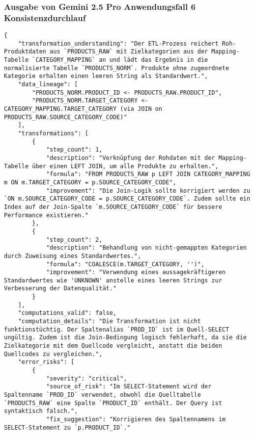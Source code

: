 \subsubsection{Ausgabe von Gemini 2.5 Pro Anwendungsfall 6 Konsistenzdurchlauf}\label{anhang:subsubsec:gemini_case6_prompt2}
\begin{lstlisting}[caption={Ausgabe: Gemini 2.5 Pro Anwendungsfall 6 Konsistenzdurchlauf},label={gemini_case6_prompt2}]
{
    "transformation_understanding": "Der ETL-Prozess reichert Roh-Produktdaten aus `PRODUCTS_RAW` mit Zielkategorien aus der Mapping-Tabelle `CATEGORY_MAPPING` an und lädt das Ergebnis in die normalisierte Tabelle `PRODUCTS_NORM`. Produkte ohne zugeordnete Kategorie erhalten einen leeren String als Standardwert.",
    "data_lineage": [
        "PRODUCTS_NORM.PRODUCT_ID <- PRODUCTS_RAW.PRODUCT_ID",
        "PRODUCTS_NORM.TARGET_CATEGORY <- CATEGORY_MAPPING.TARGET_CATEGORY (via JOIN on PRODUCTS_RAW.SOURCE_CATEGORY_CODE)"
    ],
    "transformations": [
        {
            "step_count": 1,
            "description": "Verknüpfung der Rohdaten mit der Mapping-Tabelle über einen LEFT JOIN, um alle Produkte zu erhalten.",
            "formula": "FROM PRODUCTS_RAW p LEFT JOIN CATEGORY_MAPPING m ON m.TARGET_CATEGORY = p.SOURCE_CATEGORY_CODE",
            "improvement": "Die Join-Logik sollte korrigiert werden zu `ON m.SOURCE_CATEGORY_CODE = p.SOURCE_CATEGORY_CODE`. Zudem sollte ein Index auf der Join-Spalte `m.SOURCE_CATEGORY_CODE` für bessere Performance existieren."
        },
        {
            "step_count": 2,
            "description": "Behandlung von nicht-gemappten Kategorien durch Zuweisung eines Standardwertes.",
            "formula": "COALESCE(m.TARGET_CATEGORY, '')",
            "improvement": "Verwendung eines aussagekräftigeren Standardwertes wie 'UNKNOWN' anstelle eines leeren Strings zur Verbesserung der Datenqualität."
        }
    ],
    "computations_valid": false,
    "computation_details": "Die Transformation ist nicht funktionstüchtig. Der Spaltenalias `PROD_ID` ist im Quell-SELECT ungültig. Zudem ist die Join-Bedingung logisch fehlerhaft, da sie die Zielkategorie mit dem Quellcode vergleicht, anstatt die beiden Quellcodes zu vergleichen.",
    "error_risks": [
        {
            "severity": "critical",
            "source_of_risk": "Im SELECT-Statement wird der Spaltenname `PROD_ID` verwendet, obwohl die Quelltabelle `PRODUCTS_RAW` eine Spalte `PRODUCT_ID` enthält. Der Query ist syntaktisch falsch.",
            "fix_suggestion": "Korrigieren des Spaltennamens im SELECT-Statement zu `p.PRODUCT_ID`."

\end{lstlisting}
